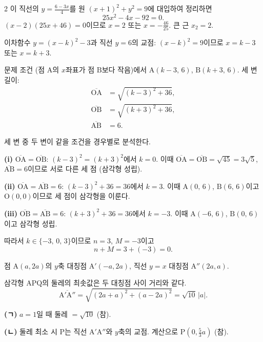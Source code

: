 \documentclass[10pt,fleqn]{article}
\renewcommand{\solpart}[1]{%
  \par\addvspace{10pt}\noindent
  {\sffamily\bfseries\color{black}(#1)}\hspace{3mm}\ignorespaces%
}
\begin{document}
\begin{multicols}{2}
이 직선의 $y = \tfrac{6-3x}{4}$를 원 $(x+1)^{2} + y^{2} = 9$에 대입하여 정리하면
\[ 25x^{2} - 4x - 92 = 0. \]
$(x - 2)(25x + 46) = 0$이므로 $x = 2$ 또는 $x = -\tfrac{46}{25}$. 큰 근 $x_{2} = 2$.


이차함수 $y=(x-k)^{2}-3$과 직선 $y=6$의 교점: $(x-k)^{2} = 9$이므로 $x = k-3$ 또는 $x = k+3$.

문제 조건 (점 $\mathrm{A}$의 $x$좌표가 점 $\mathrm{B}$보다 작음)에서 $\mathrm{A}(k-3,\,6)$, $\mathrm{B}(k+3,\,6)$. 세 변 길이:
\begin{align*}
\overline{\mathrm{OA}} &= \sqrt{(k-3)^{2}+36}, \\
\overline{\mathrm{OB}} &= \sqrt{(k+3)^{2}+36}, \\
\overline{\mathrm{AB}} &= 6.
\end{align*}

세 변 중 두 변이 같을 조건을 경우별로 분석한다.

\solpart{i} $\overline{\mathrm{OA}} = \overline{\mathrm{OB}}$: $(k-3)^{2} = (k+3)^{2}$에서 $k = 0$. 이때 $\overline{\mathrm{OA}} = \overline{\mathrm{OB}} = \sqrt{45} = 3\sqrt{5}$, $\overline{\mathrm{AB}} = 6$이므로 서로 다른 세 점 (삼각형 성립).

\solpart{ii} $\overline{\mathrm{OA}} = \overline{\mathrm{AB}} = 6$: $(k-3)^{2}+36 = 36$에서 $k = 3$. 이때 $\mathrm{A}(0,\,6)$, $\mathrm{B}(6,\,6)$이고 $\mathrm{O}(0,0)$이므로 세 점이 삼각형을 이룬다.

\solpart{iii} $\overline{\mathrm{OB}} = \overline{\mathrm{AB}} = 6$: $(k+3)^{2}+36 = 36$에서 $k = -3$. 이때 $\mathrm{A}(-6,\,6)$, $\mathrm{B}(0,\,6)$이고 삼각형 성립.

따라서 $k \in \{-3,\,0,\,3\}$이므로 $n = 3$, $M = -3$이고
\[ n + M = 3 + (-3) = 0. \]


점 $\mathrm{A}(a, 2a)$의 $y$축 대칭점 $\mathrm{A}'(-a, 2a)$, 직선 $y=x$ 대칭점 $\mathrm{A}''(2a, a)$.

삼각형 $\mathrm{APQ}$의 둘레의 최솟값은 두 대칭점 사이 거리와 같다.
\[ \overline{\mathrm{A}'\mathrm{A}''} = \sqrt{(2a+a)^{2} + (a-2a)^{2}} = \sqrt{10}\,|a|. \]

\solpart{ㄱ} $a=1$일 때 둘레 $= \sqrt{10}$ (참).

\solpart{ㄴ} 둘레 최소 시 $\mathrm{P}$는 직선 $\mathrm{A}'\mathrm{A}''$와 $y$축의 교점. 계산으로 $\mathrm{P}(0, \tfrac{5}{3}a)$ (참).


\end{multicols}
\end{document}
